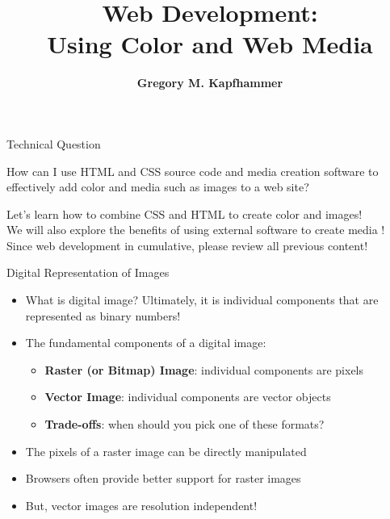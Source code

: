 \documentclass[14pt,aspectratio=169]{beamer}
\title{Web Development: \\ Using Color and Web Media}
\author{{\bf Gregory M. Kapfhammer}}
\institute[shortinst]{{\bf Department of Computer Science, Allegheny College}}
\begin{document}
{
  \begin{frame}
    \titlepage
  \end{frame}
}

%
\begin{frame}{Technical Question}
  \hspace*{.25in}
  \vspace*{.1in}
  \begin{minipage}{4.5in}
    \begin{center}
      {\large How can I use HTML and CSS source code and media creation software to
      effectively add color and media such as images to a web site?}
    \end{center}
  \end{minipage}
  \vspace{2ex}
  \begin{center}
    \small Let's learn how to combine CSS and HTML to create color and images!\\
    \small We will also explore the benefits of using external software to
    create media !\\
    \small Since web development in cumulative, please review all previous content!\\
  \end{center}
\end{frame}

%
\begin{frame}{Digital Representation of Images}
  \begin{itemize}
    \item What is digital image? Ultimately, it is individual components that
      are represented as binary numbers!
      \vspace*{-.15in}
    \item The fundamental components of a digital image:
      \begin{itemize}
        \item {\bf Raster (or Bitmap) Image}: individual components are pixels
        \item {\bf Vector Image}: individual components are vector objects
        \item {\bf Trade-offs}: when should you pick one of these formats?
      \end{itemize}
      \vspace*{-.2in}
    \item The pixels of a raster image can be directly manipulated
      \vspace*{-.2in}
    \item Browsers often provide better support for raster images
      \vspace*{-.2in}
    \item But, vector images are resolution independent!
  \end{itemize}
\end{frame}
\end{document}
